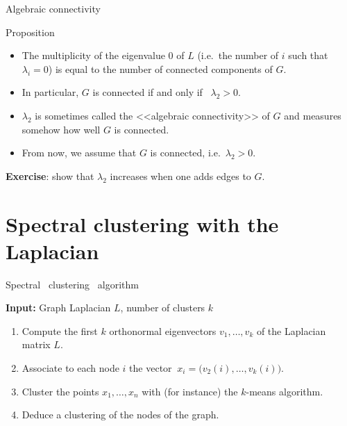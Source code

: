 \documentclass{beamer}
\begin{document}
\begin{frame}[t]{Algebraic connectivity}
	\grid

	\begin{block}{Proposition}
\begin{itemize}
	\item The multiplicity of the eigenvalue $0$ of $L$ (i.e.\ the number of $i$ such that $\lambda_i = 0$) is equal to the number of connected components of $G$.
	\item In particular, $G$ is connected if and only if \ $\lambda_2 > 0$.
\end{itemize}
\end{block}

\vspace{0.5cm}
\begin{itemize}
	\item $\lambda_2$ is sometimes called the <<algebraic connectivity>> of $G$ and measures somehow how well $G$ is connected.
	\item From now, we assume that $G$ is connected, i.e.\ $\lambda_2 >0$.
\end{itemize}

\vspace{0.5cm}
\textbf{Exercise}: show that $\lambda_2$ increases when one adds edges to $G$.
\end{frame}

\section{Spectral clustering with the Laplacian}

\begin{frame}[t]{Spectral \ clustering \ algorithm}
	\grid

	\vspace{-0.2cm}
	\textbf{Input:} Graph Laplacian $L$, number of clusters $k$
	\begin{enumerate}
		\item Compute the first $k$ orthonormal eigenvectors $v_1, \dots, v_k$ of the Laplacian matrix $L$.
			\vspace{0.1cm}
		\item Associate to each node $i$ the vector $\ x_i = \big(v_{2}(i), \dots, v_k(i) \big)$.
			\vspace{0.1cm}
		\item Cluster the points $x_1, \dots, x_n$ with (for instance) the $k$-means algorithm.
			\vspace{0.1cm}
		\item Deduce a clustering of the nodes of the graph.
	\end{enumerate}

\end{frame}
\end{document}

